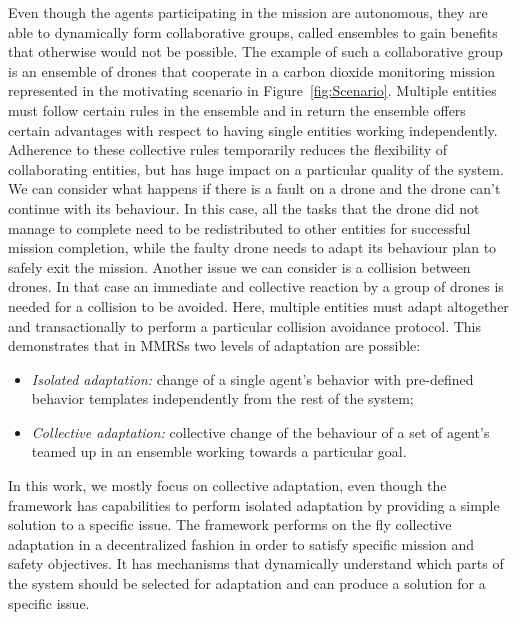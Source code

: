\documentclass[journal]{IEEEtran}
\theoremstyle{definition}
\begin{document}
Even though the agents participating in the mission are autonomous, they are able to dynamically form collaborative groups, called ensembles \cite{bucchiarone2014collective} to gain benefits that otherwise would not be possible. %
The example of such a collaborative
group is an ensemble of drones that cooperate in a carbon dioxide monitoring mission represented in the motivating scenario in Figure~\ref{fig:Scenario}. Multiple entities must follow certain rules in the ensemble and in return the ensemble offers certain
advantages with respect to having single entities working independently. Adherence to these collective
rules temporarily reduces the flexibility of collaborating entities, but has huge impact on a particular quality of the system. We can consider what happens if there is a fault on a drone and the drone can't continue with its behaviour. In this case, all the tasks that the drone did not manage to complete need to be redistributed to other entities for successful mission completion, while the faulty drone needs to adapt its behaviour plan to safely exit the mission. Another issue we can consider is a collision between drones. In that case an immediate and collective reaction by a group of drones is needed for a collision to be avoided. Here, multiple entities must adapt altogether and transactionally to perform a particular collision avoidance protocol. 
This demonstrates that in MMRSs two levels of adaptation are possible: 
\begin{itemize}
\item \textit{Isolated adaptation:} change of a single agent’s behavior with pre-defined behavior templates independently from the rest of the system;
\item \textit{Collective adaptation:} collective change of the behaviour of a set of agent's teamed up in an ensemble working towards a  particular goal.
\end{itemize}

In this work, we mostly focus on collective adaptation, even though the framework has capabilities to perform isolated adaptation by providing a simple solution to a specific issue.
The framework performs on the fly collective adaptation in a decentralized fashion in order to satisfy specific mission and safety objectives. It has mechanisms that dynamically understand  which  parts of the system  should be  selected  for adaptation and can produce a solution for a specific issue. 


\end{document}
